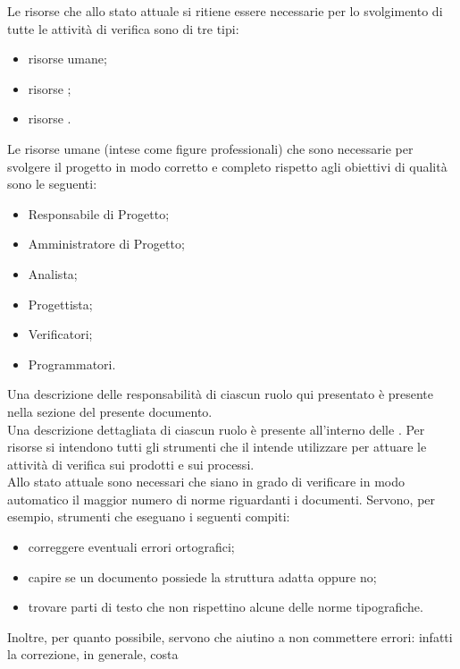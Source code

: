 			Le risorse che allo stato attuale si ritiene essere necessarie per lo svolgimento di tutte le attività di verifica 
			sono di tre tipi:
			\begin{itemize}
				\item risorse umane;
				\item risorse ;
				\item risorse .
			\end{itemize}
				Le risorse umane (intese come figure professionali) che sono necessarie per svolgere il progetto in modo corretto e completo 
				rispetto agli obiettivi di qualità sono le seguenti:
				\begin{itemize}
					\item Responsabile di Progetto;
					\item Amministratore di Progetto;
					\item Analista;
					\item Progettista;
					\item Verificatori;
					\item Programmatori.
				\end{itemize}
				Una descrizione delle responsabilità di ciascun ruolo qui presentato è presente nella sezione  del presente documento.\\
				Una descrizione dettagliata di ciascun ruolo è presente all'interno delle .
				Per risorse  si intendono tutti gli strumenti  che il  intende utilizzare per attuare le attività di verifica sui 
				prodotti e sui processi.\\
				Allo stato attuale sono necessari  che siano in grado di verificare in modo automatico il maggior numero di norme riguardanti 
				i documenti. Servono, per esempio, strumenti che eseguano i seguenti compiti:
				\begin{itemize}
					\item correggere eventuali errori ortografici;
					\item capire se un documento possiede la struttura adatta oppure no;
					\item trovare parti di testo che non rispettino alcune delle norme tipografiche.
				\end{itemize}
				Inoltre, per quanto possibile, servono  che aiutino a non commettere errori: infatti la correzione, in generale, costa 
